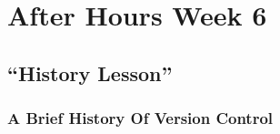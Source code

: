 \chapter{After Hours Week 6}
\section{``History Lesson''}
\subsection{A Brief History Of Version Control}
